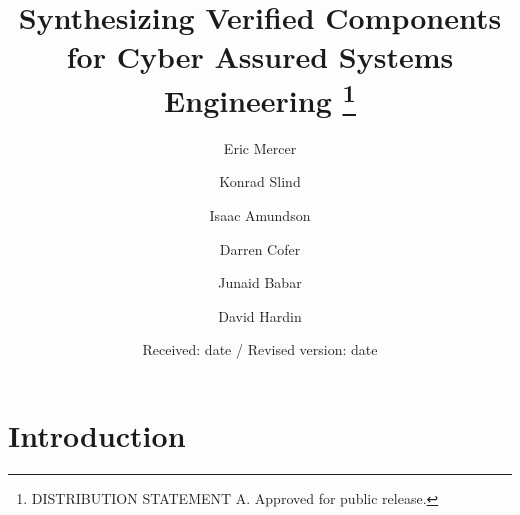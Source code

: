 \documentclass[global,twocolumn]{svjour}
\newif\ifREVISIONS
\begin{document}
\title{
  Synthesizing Verified Components for Cyber Assured Systems Engineering
  \thanks{DISTRIBUTION STATEMENT A.  Approved for public release.}
}

\author{
  Eric Mercer    \and
  Konrad Slind   \and
  Isaac Amundson \and
  Darren Cofer   \and
  Junaid Babar   \and
  David Hardin
}


\date{Received: date / Revised version: date}

\maketitle

\begin{abstract}

\end{abstract}

\section{Introduction} \label{sec:intro}


\ifREVISIONS
\subsection{SOSYM Journal Details}
The due date is \textbf{March} $22^\mathrm{nd}$, \textbf{2022}.
Go to \url{https://mc.manuscriptcentral.com/sosym/}. Create a new account (if you don't have one), login and go to the "Author"-section, select the link "Start New Submission" under Author Dashboard and select "Special Section Paper" as the paper type, and choose "MODELS 2021 Special Issue". Also, make sure to mention the MODELS 2021 special issue in the cover letter.
\fi

\ifREVISIONS
\end{document}
